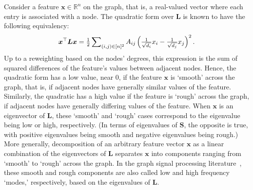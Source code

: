 \documentclass{article}
\newcommand{\Dan}[1]{\textcolor{cyan}{Dan: #1}}
\begin{document}
Consider a feature $\bm{x} \in \mathbb{R}^n$ on the graph, that is, a real-valued vector where each entry is associated with a node. The quadratic form over $\bm{L}$ is known to have the following equivalency: 
%
\begin{equation*}
    \bm{x}^\top \bm{L} \bm{x} = \tfrac{1}{2} \sum\nolimits_{(i,j) \in [n]^2} A_{ij} \left( \tfrac{1}{ \sqrt{\smash[b]{d_i}} } x_i - \tfrac{1}{\smash[b]{\sqrt{\smash[b]{d_j}}}} x_j  \right)^2 .
\end{equation*}
%
Up to a reweighting based on the nodes' degrees, this expression is the sum of squared differences of the feature's values between adjacent nodes. Hence, the quadratic form has a low value, near $0$, if the feature $\bm{x}$ is `smooth' across the graph, that is, if adjacent nodes have generally similar values of the feature. Similarly, the quadratic has a high value if the feature is `rough' across the graph, if adjacent nodes have generally differing values of the feature. When $\bm{x}$ is an eigenvector of $\bm{L}$, these `smooth' and `rough' cases correspond to the eigenvalue being low or high, respectively. (In terms of eigenvalues of $\bm{S}$, the opposite is true, with positive eigenvalues being smooth and negative eigenvalues being rough.)
More generally, decomposition of an arbitrary feature vector $\bm{x}$ as a linear combination of the eigenvectors of $\bm{L}$ separates $\bm{x}$ into components ranging from `smooth' to `rough' across the graph.
In the graph signal processing literature~\citep{ortega2018graph,huang2016graph,stankovic2019introduction}, these smooth and rough components are also called low and high frequency `modes,' respectively, based on the eigenvalues of $\bm{L}$.
\end{document}
